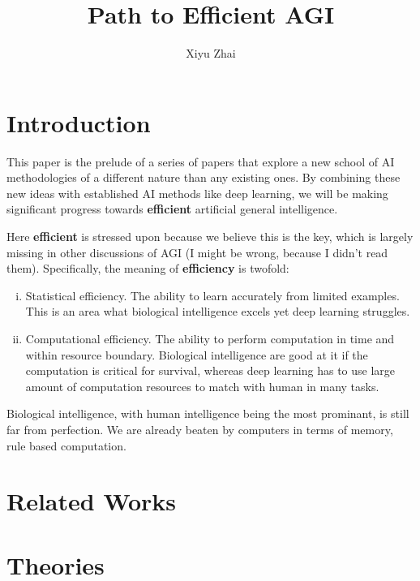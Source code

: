 \documentclass[11pt, oneside]{article}   	%
\title{Path to Efficient AGI}
\author{Xiyu Zhai}
\date{}							%
\theoremstyle{definition}
\begin{document}
\maketitle
\tableofcontents

\section{Introduction}

This paper is the prelude of a series of papers that explore a new school of AI methodologies of a different nature than any existing ones. By combining these new ideas with established AI methods like deep learning, we will be making significant progress towards \textbf{efficient} artificial general intelligence.

Here \textbf{efficient} is stressed upon because we believe this is the key, which is largely missing in other discussions of AGI (I might be wrong, because I didn't read them). Specifically, the meaning of \textbf{efficiency} is twofold:

\begin{enumerate}[(i)]
	\item Statistical efficiency. The ability to learn accurately from limited examples. This is an area what biological intelligence excels yet deep learning struggles.
	\item Computational efficiency. The ability to perform computation in time and within resource boundary. Biological intelligence are good at it if the computation is critical for survival, whereas deep learning has to use large amount of computation resources to match with human in many tasks.
\end{enumerate}

\begin{rmk}
	Biological intelligence, with human intelligence being the most prominant, is still far from perfection. We are already beaten by computers in terms of memory, rule based computation.
\end{rmk}

\section{Related Works}



\section{Theories}
\end{document}
